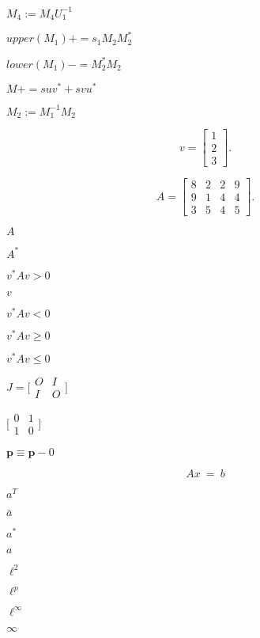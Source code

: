 \documentclass{article}
\begin{document}
$ M_4 := M_4 U_1^{-1} $
\pagebreak

$ upper(M_1) \mathrel{{+}{=}} s_1 M_2 M_2^* $
\pagebreak

$ lower(M_1) \mathbin{{-}{=}} M_2^* M_2 $
\pagebreak

$ M \mathrel{{+}{=}} s u v^* + s v u^* $
\pagebreak

$ M_2 := M_1^{-1} M_2 $
\pagebreak

\[
v =
\begin{bmatrix}
  1 \\
  2 \\
  3
\end{bmatrix}.
\]
\pagebreak

\[
A = \begin{bmatrix}
8 & 2 & 2 & 9 \\
9 & 1 & 4 & 4 \\
3 & 5 & 4 & 5
\end{bmatrix}.
\]
\pagebreak

$ A $
\pagebreak

$ A^* $
\pagebreak

$ v^* A v > 0 $
\pagebreak

$ v $
\pagebreak

$ v^* A v < 0 $
\pagebreak

$ v^* A v \ge 0 $
\pagebreak

$ v^* A v \le 0 $
\pagebreak

$ J = \bigl[ \begin{smallmatrix} O & I \\ I & O \end{smallmatrix} \bigr] $
\pagebreak

$ \bigl[ \begin{smallmatrix} 0 & 1 \\ 1 & 0 \end{smallmatrix} \bigr] $
\pagebreak

$ \mathbf{p} \equiv \mathbf{p}-0 $
\pagebreak

\[ Ax \: = \: b \]
\pagebreak

$ a^T $
\pagebreak

$ \bar{a} $
\pagebreak

$ a^* $
\pagebreak

$ a $
\pagebreak

$\ell^2$
\pagebreak

$\ell^p$
\pagebreak

$\ell^\infty$
\pagebreak

$\infty$
\pagebreak
\end{document}
